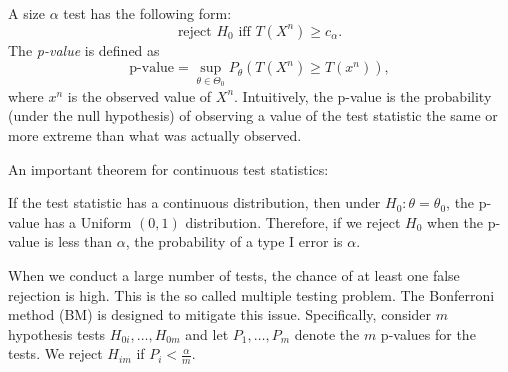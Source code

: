        
        A size $\alpha$ test has the following form:
            \begin{equation}
                \text{reject $H_0$ iff $T(X^n) \ge c_\alpha$}.
            \end{equation}
        The \emph{p-value} is defined as
            \begin{equation}
                \text{p-value} = \sup_{\theta \in \Theta_0} P_\theta(T(X^n) \ge T(x^n)),
            \end{equation}
        where $x^n$ is the observed value of $X^n$.
        Intuitively, the p-value is the probability (under the null hypothesis) of observing a value of the test statistic the same or more extreme than what was actually observed. 

        An important theorem for continuous test statistics:
            \begin{theorem}
                If the test statistic has a continuous distribution, then under $H_0: \theta = \theta_0$, the p-value has a Uniform $(0, 1)$ distribution. Therefore, if we reject $H_0$ when the p-value is less than $\alpha$, the probability of a type I error is $\alpha$.
            \end{theorem}

        When we conduct a large number of tests, the chance of at least one false rejection is high. This is the so called multiple testing problem. 
        The Bonferroni method (BM) is designed to mitigate this issue. 
        Specifically, consider $m$ hypothesis tests $H_{0i}, \ldots, H_{0m}$ and let $P_1, \ldots, P_m$ denote the $m$ p-values for the tests.
        We reject $H_{im}$ if $P_i < \frac{\alpha}{m}$.
        
        
        
        
        

